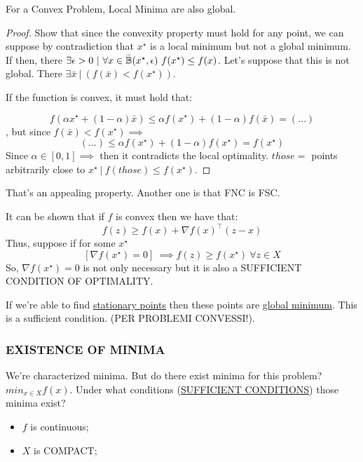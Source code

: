 \begin{prop}
For a Convex Problem, Local Minima are also global.
\end{prop}

\begin{proof}
Show that since the convexity property must hold for any point, we can suppose by contradiction that $x^\star$ is a local minimum but not a global minimum. If then, there $\exists \epsilon > 0\ |\ \forall x \in \bar{\mathbb{B}}(x^\star, \epsilon)\ f(x^\star) \leq f(x)$. Let's suppose that this is not global. There $\exists \bar{x}\ |\ (f(\bar{x}) < f(x^\star))$. 

If the function is convex, it must hold that:

\[
	f(\alpha x^\star + (1-\alpha)\bar{x}) \leq \alpha f(x^\star) + (1-\alpha)f(\bar{x}) = (\dots)
\]	
, but since $f(\bar{x}) < f(x^\star) \implies$
\[
	(\dots) \leq \alpha f(x^\star) + (1-\alpha)f(x^\star )= f(x^\star)
\]
Since $\alpha\in[0,1] \implies$ then it contradicts the local optimality. $those =$ points arbitrarily close to $x^\star\ |\ f(those) \leq f(x^\star)$. 
\end{proof}

That's an appealing property. Another one is that FNC is FSC.

\begin{thrm}
It can be shown that if $f$ is convex then we have that:
\[
	f(z) \geq f(x) + \nabla{f(x)}^\top (z-x)
\]	
Thus, suppose if for some $x^\star$
\[
	[\nabla{f(x^\star)} = 0]\ \implies f(z) \geq f(x^\star)\ \forall z \in X
\]
So, $\nabla{f(x^\star)} = 0$ is not only necessary but it is also a SUFFICIENT CONDITION OF OPTIMALITY.
\end{thrm}

If we're able to find \underline{stationary points} then these points are \underline{global minimum}. This is a sufficient condition. (PER PROBLEMI CONVESSI!).

\subsubsection{EXISTENCE OF MINIMA}

We're characterized minima. But do there exist minima for this problem? $min_{x\in X}{f(x)}$. Under what conditions (\underline{SUFFICIENT CONDITIONS}) those minima exist?

\begin{itemize}
\item $f$ is continuous;
\item $X$ is COMPACT;
\end{itemize}

